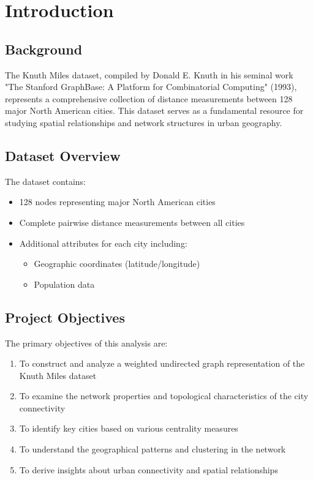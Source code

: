 \chapter{Introduction}

\section{Background}
The Knuth Miles dataset, compiled by Donald E. Knuth in his seminal work "The Stanford GraphBase: A Platform for Combinatorial Computing" (1993), represents a comprehensive collection of distance measurements between 128 major North American cities. This dataset serves as a fundamental resource for studying spatial relationships and network structures in urban geography.

\section{Dataset Overview}
The dataset contains:
\begin{itemize}
    \item 128 nodes representing major North American cities
    \item Complete pairwise distance measurements between all cities
    \item Additional attributes for each city including:
    \begin{itemize}
        \item Geographic coordinates (latitude/longitude)
        \item Population data
    \end{itemize}
\end{itemize}

\section{Project Objectives}
The primary objectives of this analysis are:
\begin{enumerate}
    \item To construct and analyze a weighted undirected graph representation of the Knuth Miles dataset
    \item To examine the network properties and topological characteristics of the city connectivity
    \item To identify key cities based on various centrality measures
    \item To understand the geographical patterns and clustering in the network
    \item To derive insights about urban connectivity and spatial relationships
\end{enumerate}

